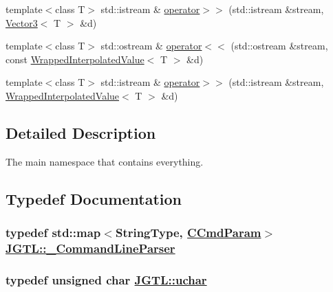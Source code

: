 \begin{CompactItemize}
\item 
template$<$class T$>$ std::istream \& \hyperlink{namespace_j_g_t_l_08552e8d16a63eaef00c7e3062af4ab0}{operator$>$$>$} (std::istream \&stream, \hyperlink{class_j_g_t_l_1_1_vector3}{Vector3}$<$ T $>$ \&d)
\item 
template$<$class T$>$ std::ostream \& \hyperlink{namespace_j_g_t_l_5fdc2174e5f64c78281b0cb9223a4d2f}{operator$<$$<$} (std::ostream \&stream, const \hyperlink{class_j_g_t_l_1_1_wrapped_interpolated_value}{Wrapped\-Interpolated\-Value}$<$ T $>$ \&d)
\item 
template$<$class T$>$ std::istream \& \hyperlink{namespace_j_g_t_l_26e27f07434450b794de382d8b607b25}{operator$>$$>$} (std::istream \&stream, \hyperlink{class_j_g_t_l_1_1_wrapped_interpolated_value}{Wrapped\-Interpolated\-Value}$<$ T $>$ \&d)
\end{CompactItemize}


\subsection{Detailed Description}
The main namespace that contains everything. 

\subsection{Typedef Documentation}
\hypertarget{namespace_j_g_t_l_93797b96f684075b65783b93d11f2f1d}{
\subsubsection[\_\-CommandLineParser]{\setlength{\rightskip}{0pt plus 5cm}typedef std::map$<$String\-Type, \hyperlink{struct_j_g_t_l_1_1_c_cmd_param}{CCmd\-Param}$>$ \hyperlink{namespace_j_g_t_l_93797b96f684075b65783b93d11f2f1d}{JGTL::\_\-Command\-Line\-Parser}}}
\label{namespace_j_g_t_l_93797b96f684075b65783b93d11f2f1d}


\hypertarget{namespace_j_g_t_l_16d84383f2c4546df4385d012e588239}{
\subsubsection[uchar]{\setlength{\rightskip}{0pt plus 5cm}typedef unsigned char \hyperlink{namespace_j_g_t_l_16d84383f2c4546df4385d012e588239}{JGTL::uchar}}}
\label{namespace_j_g_t_l_16d84383f2c4546df4385d012e588239}


